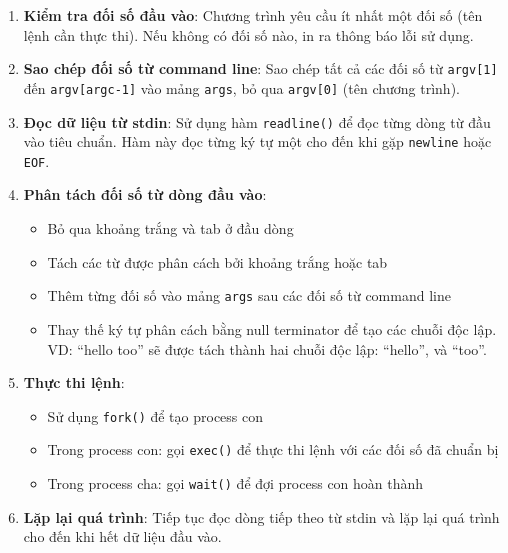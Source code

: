 \begin{enumerate}
    \item \textbf{Kiểm tra đối số đầu vào}: Chương trình yêu cầu ít nhất một đối số (tên lệnh cần thực thi). Nếu không có đối số nào, in ra thông báo lỗi sử dụng.

    \item \textbf{Sao chép đối số từ command line}: Sao chép tất cả các đối số từ \texttt{argv[1]} đến \texttt{argv[argc-1]} vào mảng \texttt{args}, bỏ qua \texttt{argv[0]} (tên chương trình).

    \item \textbf{Đọc dữ liệu từ stdin}: Sử dụng hàm \texttt{readline()} để đọc từng dòng từ đầu vào tiêu chuẩn. Hàm này đọc từng ký tự một cho đến khi gặp \texttt{newline} hoặc \texttt{EOF}.

    \item \textbf{Phân tách đối số từ dòng đầu vào}:
    \begin{itemize}
        \item Bỏ qua khoảng trắng và tab ở đầu dòng
        \item Tách các từ được phân cách bởi khoảng trắng hoặc tab
        \item Thêm từng đối số vào mảng \texttt{args} sau các đối số từ command line
        \item Thay thế ký tự phân cách bằng null terminator để tạo các chuỗi độc lập.\\VD: ``hello too'' sẽ được tách thành hai chuỗi độc lập: ``hello'', và ``too''.
    \end{itemize}

    \item \textbf{Thực thi lệnh}:
    \begin{itemize}
        \item Sử dụng \texttt{fork()} để tạo process con
        \item Trong process con: gọi \texttt{exec()} để thực thi lệnh với các đối số đã chuẩn bị
        \item Trong process cha: gọi \texttt{wait()} để đợi process con hoàn thành
    \end{itemize}

    \item \textbf{Lặp lại quá trình}: Tiếp tục đọc dòng tiếp theo từ stdin và lặp lại quá trình cho đến khi hết dữ liệu đầu vào.
\end{enumerate}
